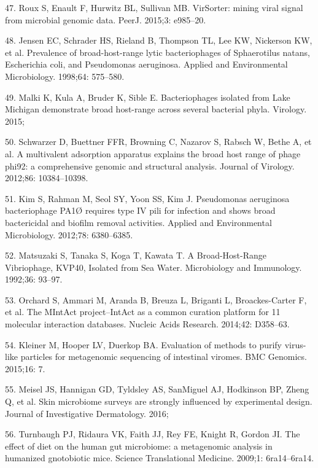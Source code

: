 \documentclass[12pt,]{article}
\begin{document}
\hypertarget{ref-Roux:2015dh}{}
47. Roux S, Enault F, Hurwitz BL, Sullivan MB. VirSorter: mining viral
signal from microbial genomic data. PeerJ. 2015;3: e985--20.

\hypertarget{ref-Jensen:1998vh}{}
48. Jensen EC, Schrader HS, Rieland B, Thompson TL, Lee KW, Nickerson
KW, et al. Prevalence of broad-host-range lytic bacteriophages of
Sphaerotilus natans, Escherichia coli, and Pseudomonas aeruginosa.
Applied and Environmental Microbiology. 1998;64: 575--580.

\hypertarget{ref-Malki:2015tm}{}
49. Malki K, Kula A, Bruder K, Sible E. Bacteriophages isolated from
Lake Michigan demonstrate broad host-range across several bacterial
phyla. Virology. 2015;

\hypertarget{ref-Schwarzer:2012ez}{}
50. Schwarzer D, Buettner FFR, Browning C, Nazarov S, Rabsch W, Bethe A,
et al. A multivalent adsorption apparatus explains the broad host range
of phage phi92: a comprehensive genomic and structural analysis. Journal
of Virology. 2012;86: 10384--10398.

\hypertarget{ref-Kim:2012dh}{}
51. Kim S, Rahman M, Seol SY, Yoon SS, Kim J. Pseudomonas aeruginosa
bacteriophage PA1Ø requires type IV pili for infection and shows broad
bactericidal and biofilm removal activities. Applied and Environmental
Microbiology. 2012;78: 6380--6385.

\hypertarget{ref-Matsuzaki:1992gw}{}
52. Matsuzaki S, Tanaka S, Koga T, Kawata T. A Broad-Host-Range
Vibriophage, KVP40, Isolated from Sea Water. Microbiology and
Immunology. 1992;36: 93--97.

\hypertarget{ref-Orchard:2014hq}{}
53. Orchard S, Ammari M, Aranda B, Breuza L, Briganti L, Broackes-Carter
F, et al. The MIntAct project--IntAct as a common curation platform for
11 molecular interaction databases. Nucleic Acids Research. 2014;42:
D358--63.

\hypertarget{ref-Kleiner:2015kd}{}
54. Kleiner M, Hooper LV, Duerkop BA. Evaluation of methods to purify
virus-like particles for metagenomic sequencing of intestinal viromes.
BMC Genomics. 2015;16: 7.

\hypertarget{ref-Meisel:2016iu}{}
55. Meisel JS, Hannigan GD, Tyldsley AS, SanMiguel AJ, Hodkinson BP,
Zheng Q, et al. Skin microbiome surveys are strongly influenced by
experimental design. Journal of Investigative Dermatology. 2016;

\hypertarget{ref-Turnbaugh:2009hf}{}
56. Turnbaugh PJ, Ridaura VK, Faith JJ, Rey FE, Knight R, Gordon JI. The
effect of diet on the human gut microbiome: a metagenomic analysis in
humanized gnotobiotic mice. Science Translational Medicine. 2009;1:
6ra14--6ra14.
\end{document}
